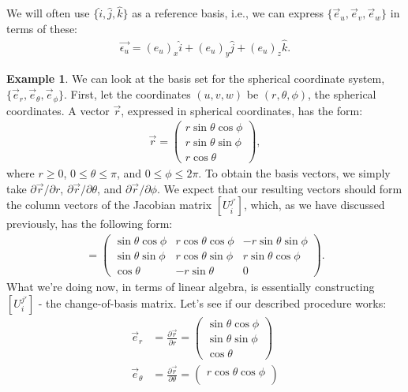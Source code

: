 \documentclass{book}
\theoremstyle{definition}
\newtheorem{exmp}{Example}[section]
\begin{document}
We will often use $\{\hat{i}, \hat{j}, \hat{k} \}$ as a reference basis, i.e., we can express $\{\vec{e}_u, \vec{e}_v ,\vec{e}_w\}$ in terms of these:
\begin{align*}
\vec{\epsilon_u} = (e_u)_x\hat{i} + (e_u)_y\hat{j} + (e_u)_z\hat{k}.
\end{align*}
\begin{exmp}
We can look at the basis set for the spherical coordinate system, $\{\vec{e}_r, \vec{e}_\theta, \vec{e}_\phi \}$. First, let the coordinates $(u,v,w)$ be $(r,\theta,\phi)$, the spherical coordinates. A vector $\vec{r}$, expressed in spherical coordinates, has the form:
\begin{align*}
\vec{r} = 
\begin{pmatrix}
r\sin\theta\cos\phi\\
r\sin\theta\sin\phi\\
r\cos\theta
\end{pmatrix},
\end{align*}
where $r \geq 0$, $0 \leq \theta \leq \pi$, and $0 \leq \phi \leq 2\pi$. To obtain the basis vectors, we simply take $\partial \vec{r}/\partial r$, $\partial \vec{r}/\partial \theta$, and $\partial \vec{r}/\partial \phi$. We expect that our resulting vectors should form the column vectors of the Jacobian matrix $[U^{j'}_i]$, which, as we have discussed previously, has the following form:
\begin{align*}
[U^{j'}_i] = 
\begin{pmatrix}
\sin\theta\cos\phi & r\cos\theta\cos\phi & -r\sin\theta\sin\phi \\
\sin\theta\sin\phi & r\cos\theta\sin\phi & r\sin\theta\cos\phi \\
\cos\theta & -r\sin\theta & 0
\end{pmatrix}.
\end{align*}
What we're doing now, in terms of linear algebra, is essentially constructing $[U^{j'}_i]$ - the change-of-basis matrix. Let's see if our described procedure works:
\begin{align*}
\vec{e}_r &= \frac{\partial \vec{r}}{\partial r} = \begin{pmatrix}
\sin\theta\cos\phi\\
\sin\theta\sin\phi\\
\cos\theta
\end{pmatrix}\\
\vec{e}_\theta &= \frac{\partial \vec{r}}{\partial \theta} = 
\begin{pmatrix}
r\cos\theta\cos\phi\\

\end{pmatrix}
\end{align*}
\end{exmp}
\end{document}
